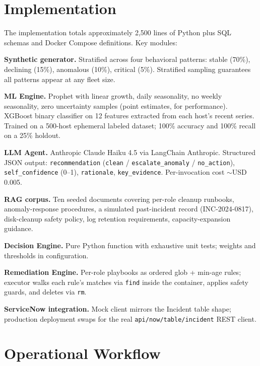 \documentclass[conference]{IEEEtran}
\begin{document}
\section{Implementation}
\label{sec:impl}

The implementation totals approximately 2{,}500 lines of Python plus
SQL schemas and Docker Compose definitions. Key modules:

\textbf{Synthetic generator.} Stratified across four behavioral
patterns: stable (70\%), declining (15\%), anomalous (10\%),
critical (5\%). Stratified sampling guarantees all patterns appear
at any fleet size.

\textbf{ML Engine.} Prophet \cite{taylor2018forecasting} with linear
growth, daily seasonality, no weekly seasonality, zero uncertainty
samples (point estimates, for performance). XGBoost
\cite{chen2016xgboost} binary classifier on 12 features extracted
from each host's recent series. Trained on a 500-host ephemeral
labeled dataset; 100\% accuracy and 100\% recall on a 25\% holdout.

\textbf{LLM Agent.} Anthropic Claude Haiku 4.5
\cite{anthropic2024claude3} via LangChain Anthropic. Structured JSON
output: \texttt{recommendation} (\texttt{clean} /
\texttt{escalate\_anomaly} / \texttt{no\_action}),
\texttt{self\_confidence} (0--1), \texttt{rationale},
\texttt{key\_evidence}. Per-invocation cost $\sim$USD 0.005.

\textbf{RAG corpus.} Ten seeded documents covering per-role cleanup
runbooks, anomaly-response procedures, a simulated past-incident
record (INC-2024-0817), disk-cleanup safety policy, log retention
requirements, capacity-expansion guidance.

\textbf{Decision Engine.} Pure Python function with exhaustive unit
tests; weights and thresholds in configuration.

\textbf{Remediation Engine.} Per-role playbooks as ordered glob +
min-age rules; executor walks each rule's matches via \texttt{find}
inside the container, applies safety guards, and deletes via
\texttt{rm}.

\textbf{ServiceNow integration.} Mock client mirrors the Incident
table shape; production deployment swaps for the real
\texttt{api/now/table/incident} REST client.

\section{Operational Workflow}
\label{sec:flow}
\end{document}
